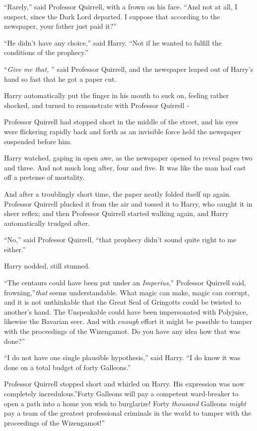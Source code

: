 ``Rarely,'' said Professor Quirrell, with a frown on his face. ``And not
at all, I suspect, since the Dark Lord departed. I suppose that
according to the newspaper, your father just paid it?''

``He didn't have any choice,'' said Harry. ``Not if he wanted to fulfill
the conditions of the prophecy.''

``\emph{Give me that,} '' said Professor Quirrell, and the newspaper
leaped out of Harry's hand so fast that he got a paper cut.

Harry automatically put the finger in his mouth to suck on, feeling
rather shocked, and turned to remonstrate with Professor Quirrell -

Professor Quirrell had stopped short in the middle of the street, and
his eyes were flickering rapidly back and forth as an invisible force
held the newspaper suspended before him.

Harry watched, gaping in open awe, as the newspaper opened to reveal
pages two and three. And not much long after, four and five. It was like
the man had cast off a pretense of mortality.

And after a troublingly short time, the paper neatly folded itself up
again. Professor Quirrell plucked it from the air and tossed it to
Harry, who caught it in sheer reflex; and then Professor Quirrell
started walking again, and Harry automatically trudged after.

``No,'' said Professor Quirrell, ``that prophecy didn't sound quite
right to me either.''

Harry nodded, still stunned.

``The centaurs could have been put under an \emph{Imperius},'' Professor
Quirrell said, frowning,''\emph{that} seems understandable. What magic
can make, magic can corrupt, and it is not unthinkable that the Great
Seal of Gringotts could be twisted to another's hand. The Unspeakable
could have been impersonated with Polyjuice, likewise the Bavarian seer.
And with \emph{enough} effort it might be possible to tamper with the
proceedings of the Wizengamot. Do you have any idea how that was done?''

``I do not have one single plausible hypothesis,'' said Harry. ``I do
know it was done on a total budget of forty Galleons.''

Professor Quirrell stopped short and whirled on Harry. His expression
was now completely incredulous.''Forty Galleons will pay a competent
ward-breaker to open a path into a home you wish to burglarize! Forty
\emph{thousand} Galleons \emph{might} pay a team of the greatest
professional criminals in the world to tamper with the proceedings of
the Wizengamot!''

